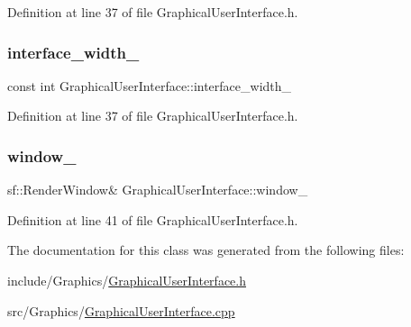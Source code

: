 Definition at line 37 of file Graphical\+User\+Interface.\+h.

\mbox{\label{classGraphicalUserInterface_ae3c07ea59e557909f92882028fafb0a3}} 
\subsubsection{\texorpdfstring{interface\+\_\+width\+\_\+}{interface\_width\_}}
{\footnotesize\ttfamily const int Graphical\+User\+Interface\+::interface\+\_\+width\+\_\+\hspace{0.3cm}{\ttfamily [private]}}



Definition at line 37 of file Graphical\+User\+Interface.\+h.

\mbox{\label{classGraphicalUserInterface_ae51adeb759a97196eda3b37bfc80a452}} 
\subsubsection{\texorpdfstring{window\+\_\+}{window\_}}
{\footnotesize\ttfamily sf\+::\+Render\+Window\& Graphical\+User\+Interface\+::window\+\_\+\hspace{0.3cm}{\ttfamily [private]}}



Definition at line 41 of file Graphical\+User\+Interface.\+h.



The documentation for this class was generated from the following files\+:\begin{DoxyCompactItemize}
\item 
include/\+Graphics/\hyperlink{GraphicalUserInterface_8h}{Graphical\+User\+Interface.\+h}\item 
src/\+Graphics/\hyperlink{GraphicalUserInterface_8cpp}{Graphical\+User\+Interface.\+cpp}\end{DoxyCompactItemize}
